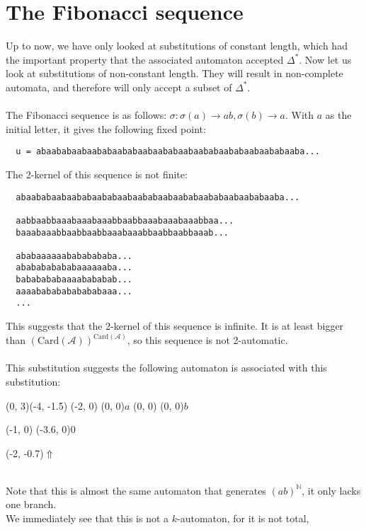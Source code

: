 \documentclass{article}
\begin{document}
\section*{The Fibonacci sequence}
Up to now, we have only looked at substitutions of constant length, which had
the important property that the associated automaton accepted
$\Delta^*$. Now let us look at substitutions of non-constant
length. They will result in non-complete automata, and therefore will only
accept a subset of $\Delta^*$.\\
\\
The Fibonacci sequence is as follows: $\sigma: \sigma(a) \rightarrow ab,
\sigma(b) \rightarrow a$. With $a$ as the initial letter, it gives the
following fixed point:
\begin{verbatim}
  u = abaababaabaababaababaabaababaabaababaababaabaababaaba...
\end{verbatim}
The 2-kernel of this sequence is not finite:
\begin{verbatim}
  abaababaabaababaababaabaababaabaababaababaabaababaaba...

  aabbaabbaaabaaabaaabbaabbaaabaaabaaabbaa...
  baaabaaabbaabbaabbaaabaaabbaabbaabbaaab...

  ababaaaaaabababababa...
  ababababababaaaaaaba...
  bababababaaaabababab...
  aaaabababababababaaa...
  ...
\end{verbatim}
This suggests that the 2-kernel of this sequence is infinite. It is at least
bigger than $(\mathrm{Card}(\mathcal{A}))^{\mathrm{Card}(\mathcal{A})}$, so
this sequence is not 2-automatic.\\
\\
This substitution suggests the following automaton is associated with this
substitution:\\
\begin{graph}(0, 3)(-4, -1.5)
  (-2, 0) (0, 0){$a$}
  (0, 0)  (0, 0){$b$}

  (-1, 0) \freetext(-3.6, 0){0}
   
   

  \freetext(-2, -0.7){$\Uparrow$}
\end{graph}\\
Note that this is almost the same automaton that generates
$(ab)^{\mathbb{N}}$, it only lacks one branch.\\
We immediately see that this is not a $k$-automaton, for it is not total,
\end{document}
